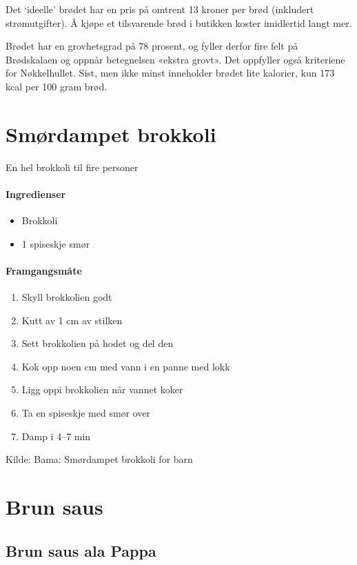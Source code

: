 \documentclass[12pt,a4paper]{book}
\begin{document}
Det `ideelle' brødet har en pris på omtrent 13 kroner per brød (inkludert strømutgifter). Å kjøpe et tilsvarende brød i butikken koster imidlertid langt mer.

Brødet har en grovhetsgrad på 78 prosent, og fyller derfor fire felt på Brødskalaen og oppnår betegnelsen «ekstra grovt». Det oppfyller også kriteriene for Nøkkelhullet. Sist, men ikke minst inneholder brødet lite kalorier, kun 173 kcal per 100 gram brød.
\clearpage{}
\clearpage{}\section{﻿Smørdampet brokkoli}
\label{brokkoli}
En hel brokkoli til fire personer

\paragraph{Ingredienser}
\begin{itemize}[noitemsep]
	\item Brokkoli
	\item 1 spiseskje smør
\end{itemize}

\paragraph{Framgangsmåte}
\begin{enumerate}[noitemsep]
	\item Skyll brokkolien godt
	\item Kutt av 1 cm av stilken
	\item Sett brokkolien på hodet og del den
	\item Kok opp noen cm med vann i en panne med lokk
	\item Ligg oppi brokkolien når vannet koker
	\item Ta en spiseskje med smør over
	\item Damp i 4--7 min
\end{enumerate}

Kilde: Bama: Smørdampet brokkoli for barn
\clearpage{}
\clearpage{}\section{Brun saus}


\subsection{Brun saus ala Pappa}
\end{document}
